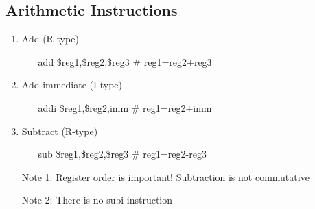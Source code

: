 \documentclass[12pt]{article}
\begin{document}
\subsection{Arithmetic Instructions}
\begin{enumerate}
  \item Add (R-type)
  \begin{enumerate}
    \item[add] \$reg1,\$reg2,\$reg3 \# reg1=reg2+reg3
  \end{enumerate}
  \item Add immediate (I-type)
  \begin{enumerate}
    \item[addi] \$reg1,\$reg2,imm \# reg1=reg2+imm
  \end{enumerate}
  \item Subtract (R-type)
  \begin{enumerate}
    \item[sub] \$reg1,\$reg2,\$reg3 \# reg1=reg2-reg3
  \end{enumerate}
  \item[] Note 1: Register order is important! Subtraction is not commutative
  \item[] Note 2: There is no subi instruction
\end{enumerate}
\end{document}
